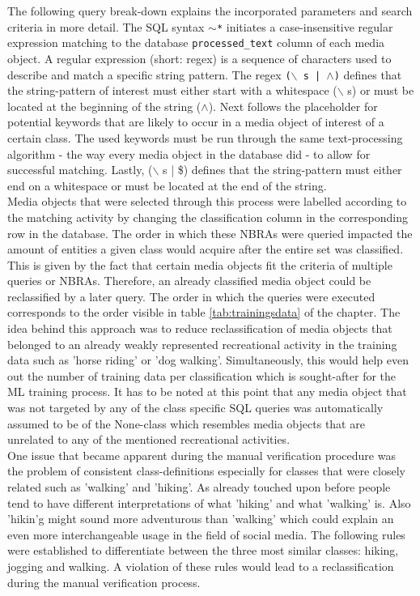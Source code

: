 The following query break-down explains the incorporated parameters and search criteria in more detail. The SQL syntax \texttt{$\sim$*} initiates a case-insensitive regular expression matching to the database \texttt{processed\_text} column of each media object. A regular expression (short: regex) is a sequence of characters used to describe and match a specific string pattern. The regex \texttt{($\backslash$ s | $\wedge$)} defines that the string-pattern of interest must either start with a whitespace ($\backslash$ s) or must be located at the beginning of the string ($\wedge$). Next follows the placeholder for potential keywords that are likely to occur in a media object of interest of a certain class. The used keywords must be run through the same text-processing algorithm - the way every media object in the database did - to allow for successful matching. Lastly, ($\backslash$ s | \$) defines that the string-pattern must either end on a whitespace or must be located at the end of the string.\\
Media objects that were selected through this process were labelled according to the matching activity by changing the classification column in the corresponding row in the database. The order in which these NBRAs were queried impacted the amount of entities a given class would acquire after the entire set was classified. This is given by the fact that certain media objects fit the criteria of multiple queries or NBRAs. Therefore, an already classified media object could be reclassified by a later query. The order in which the queries were executed corresponds to the order visible in table \ref{tab:trainingsdata} of the  chapter. The idea behind this approach was to reduce reclassification of media objects that belonged to an already weakly represented recreational activity in the training data such as 'horse riding' or 'dog walking'. Simultaneously, this would help even out the number of training data per classification which is sought-after for the ML training process. It has to be noted at this point that any media object that was not targeted by any of the class specific SQL queries was automatically assumed to be of the None-class which resembles media objects that are unrelated to any of the mentioned recreational activities.\\

One issue that became apparent during the manual verification procedure was the problem of consistent class-definitions especially for classes that were closely related such as 'walking' and 'hiking'. As already touched upon before people tend to have different interpretations of what 'hiking' and what 'walking' is. Also 'hikin'g might sound more adventurous than 'walking' which could explain an even more interchangeable usage in the field of social media. The following rules were established to differentiate between the three most similar classes: hiking, jogging and walking. A violation of these rules would lead to a reclassification during the manual verification process.

